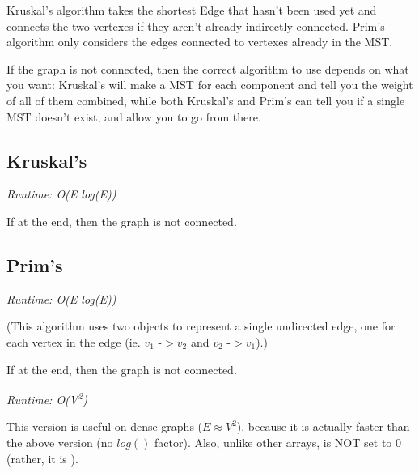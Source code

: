 
Kruskal's algorithm takes the shortest Edge that hasn't been used yet and connects the two vertexes if they aren't already indirectly connected. Prim's algorithm only considers the edges connected to vertexes already in the MST.

If the graph is not connected, then the correct algorithm to use depends on what you want: Kruskal's will make a MST for each component and tell you the weight of all of them combined, while both Kruskal's and Prim's can tell you if a single MST doesn't exist, and allow you to go from there.

\subsection*{Kruskal's}

\textit{Runtime: O(E log(E))}

If  at the end, then the graph is not connected.



\subsection*{Prim's}

\textit{Runtime: O(E log(E))}

(This algorithm uses two  objects to represent a single undirected edge, one for each vertex in the edge (ie. $v_1$ -$> v_2$ and $v_2$ -$> v_1$).)

If  at the end, then the graph is not connected.



\textit{Runtime: O(V\textsuperscript{2})}

This version is useful on dense graphs ($E \approx V^2$), because it is actually faster than the above version (no $log()$ factor). Also, unlike other  arrays,  is NOT set to 0 (rather, it is ).



\newpage